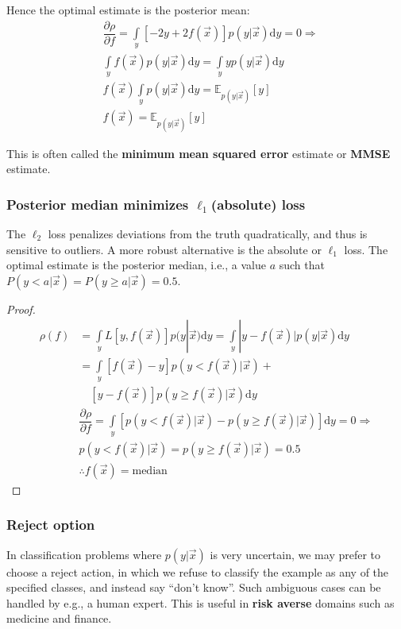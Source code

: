 Hence the optimal estimate is the posterior mean:
\begin{align}
& \dfrac{\partial \rho}{\partial f} =\int\limits_y [-2y+2f(\vec{x})]p(y|\vec{x})\mathrm{d}y=0 \Rightarrow \nonumber \\
& \int\limits_y f(\vec{x})p(y|\vec{x})\mathrm{d}y = \int\limits_y yp(y|\vec{x})\mathrm{d}y \nonumber \\
& f(\vec{x}) \int\limits_y p(y|\vec{x})\mathrm{d}y = \mathbb{E}_{p(y|\vec{x})}[y] \nonumber \\
& f(\vec{x}) = \mathbb{E}_{p(y|\vec{x})}[y]
\end{align}

This is often called the \textbf{minimum mean squared error} estimate or \textbf{MMSE} estimate.


\subsubsection{Posterior median minimizes $\ell_1$(absolute) loss}
The $\ell_2$ loss penalizes deviations from the truth quadratically, and thus is sensitive to outliers. A more robust alternative is the absolute or $\ell_1$ loss. The optimal estimate is the posterior median, i.e., a value $a$ such that $P(y<a|\vec{x})=P(y \geq a|\vec{x})=0.5$.

\begin{proof}
\begin{align*}
\rho(f)& =\int\limits_y L[y,f(\vec{x})]p(y|\vec{x})\mathrm{d}y=\int\limits_y |y-f(\vec{x})|p(y|\vec{x})\mathrm{d}y \\
       & =\int\limits_y [f(\vec{x})-y]p(y<f(\vec{x})|\vec{x})+ \\
	   & \quad [y-f(\vec{x})]p(y \geq f(\vec{x})|\vec{x})\mathrm{d}y \\
& \dfrac{\partial \rho}{\partial f}=\int\limits_y \left[p(y<f(\vec{x})|\vec{x})-p(y \geq f(\vec{x})|\vec{x})\right]\mathrm{d}y=0 \Rightarrow \\
& p(y<f(\vec{x})|\vec{x})=p(y \geq f(\vec{x})|\vec{x})=0.5 \\
& \therefore f(\vec{x})=\text{median}
\end{align*}
\end{proof}


\subsubsection{Reject option}
In classification problems where $p(y|\vec{x})$ is very uncertain, we may prefer to choose a reject action, in which we refuse to classify the example as any of the specified classes, and instead say “don’t know”. Such ambiguous cases can be handled by e.g., a human expert. This is useful in \textbf{risk averse} domains such as medicine and finance.

